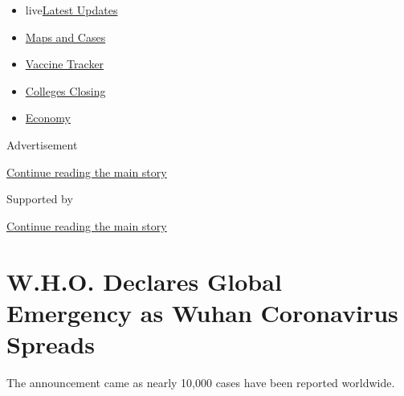 \begin{itemize}
\tightlist
\item
  live\href{https://www.nytimes3xbfgragh.onion/2020/08/21/world/covid-19-coronavirus.html?name=styln-coronavirus-national\&region=TOP_BANNER\&variant=undefined\&block=storyline_menu_recirc\&action=click\&pgtype=Article\&impression_id=3d2d3d40-e3a7-11ea-974d-d37311179bca}{Latest
  Updates}
\item
  \href{https://www.nytimes3xbfgragh.onion/interactive/2020/us/coronavirus-us-cases.html?name=styln-coronavirus-national\&region=TOP_BANNER\&variant=undefined\&block=storyline_menu_recirc\&action=click\&pgtype=Article\&impression_id=3d2d3d41-e3a7-11ea-974d-d37311179bca}{Maps
  and Cases}
\item
  \href{https://www.nytimes3xbfgragh.onion/interactive/2020/science/coronavirus-vaccine-tracker.html?name=styln-coronavirus-national\&region=TOP_BANNER\&variant=undefined\&block=storyline_menu_recirc\&action=click\&pgtype=Article\&impression_id=3d2d3d42-e3a7-11ea-974d-d37311179bca}{Vaccine
  Tracker}
\item
  \href{https://www.nytimes3xbfgragh.onion/2020/08/19/us/colleges-closing-covid.html?name=styln-coronavirus-national\&region=TOP_BANNER\&variant=undefined\&block=storyline_menu_recirc\&action=click\&pgtype=Article\&impression_id=3d2d3d43-e3a7-11ea-974d-d37311179bca}{Colleges
  Closing}
\item
  \href{https://www.nytimes3xbfgragh.onion/live/2020/08/20/business/stock-market-today-coronavirus?name=styln-coronavirus-national\&region=TOP_BANNER\&variant=undefined\&block=storyline_menu_recirc\&action=click\&pgtype=Article\&impression_id=3d2d3d44-e3a7-11ea-974d-d37311179bca}{Economy}
\end{itemize}

Advertisement

\protect\hyperlink{after-top}{Continue reading the main story}

Supported by

\protect\hyperlink{after-sponsor}{Continue reading the main story}

\hypertarget{who-declares-global-emergency-as-wuhan-coronavirus-spreads}{%
\section{W.H.O. Declares Global Emergency as Wuhan Coronavirus
Spreads}\label{who-declares-global-emergency-as-wuhan-coronavirus-spreads}}

The announcement came as nearly 10,000 cases have been reported
worldwide.

